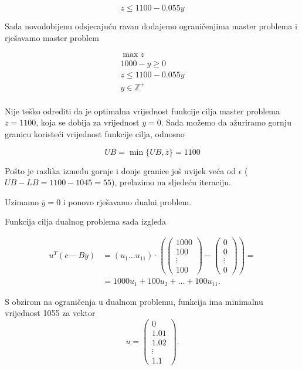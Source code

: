 \documentclass[b5paper, utf8, 11pt, colorlinks]{book}
\theoremstyle{definition}
\begin{document}
$$z\leqslant 1100-0.055y$$

Sada novodobijenu odsjecajuću ravan dodajemo ograničenjima master problema i rješavamo master problem

$$
\begin{aligned}
	\max z\\
	1000-y\geqslant 0\\
	z\leqslant 1100-0.055y\\ 
	y\in\mathbb{Z}^+\\	
\end{aligned}
$$

Nije teško odrediti da je optimalna vrijednost funkcije cilja master problema $\overline{z}=1100$, koja se dobija za vrijednost $\overline{y}=0$.
Sada možemo da ažuriramo gornju granicu koristeći vrijednost funkcije cilja, odnosno

$$UB = \min\{UB,\overline{z}\} = 1100$$

Pošto je razlika između gornje i donje granice još uvijek veća od $\epsilon$ ($UB-LB = 1100-1045=55$), prelazimo na sljedeću iteraciju.

Uzimamo $\overline{y}=0$ i ponovo rješavamo dualni problem.

Funkcija cilja dualnog problema sada izgleda 

 \begin{align*}
u^T (c-B\overline{y})&=(u_1\ldots u_{11})\cdot \left(\left(\begin{array}{c}
	1000 \\
	100 \\
	\vdots \\
	100
\end{array}\right)-\left(\begin{array}{c}
	0 \\
	0 \\
	\vdots \\
	0
\end{array}\right)\right)=\\
& =1000u_1+ 100u_2+\ldots+100u_{11}.
\end{align*}

S obzirom na ograničenja u dualnom problemu, funkcija ima minimalnu vrijednost 1055 za vektor $$u=\left(\begin{array}{c}
	0\\
	1.01 \\
	1.02 \\
	\vdots \\
	1.1
\end{array}\right).$$
\end{document}
